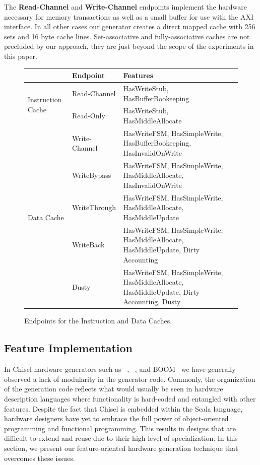 \documentclass[conference]{IEEEtran}
\begin{document}
The \textbf{Read-Channel} and \textbf{Write-Channel} endpoints implement the hardware necessary for memory transactions as well as a small buffer for use with the AXI interface. In all other cases our generator creates a direct mapped cache with 256 sets and 16 byte cache lines. Set-associative and fully-associative caches are not precluded by our approach, they are just beyond the scope of the experiments in this paper.

\begin{figure}[ht]
    \centering
\scriptsize
\begin{tabular}{llll}\toprule
&Endpoint &Features \\\midrule
\multirow{2}{*}{Instruction Cache} &Read-Channel &HasWriteStub, HasBufferBookeeping \\
&Read-Only &HasWriteStub, HasMiddleAllocate \\\midrule
\multirow{5}{*}{Data Cache} &Write-Channel &HasWriteFSM, HasSimpleWrite, HasBufferBookeeping, HasInvalidOnWrite \\
&WriteBypass &HasWriteFSM, HasSimpleWrite, HasMiddleAllocate, HasInvalidOnWrite \\
&WriteThrough &HasWriteFSM, HasSimpleWrite, HasMiddleAllocate, HasMiddleUpdate \\
&WriteBack &HasWriteFSM, HasSimpleWrite, HasMiddleAllocate, HasMiddleUpdate, Dirty Accounting \\
&Dusty &HasWriteFSM, HasSimpleWrite, HasMiddleAllocate, HasMiddleUpdate, Dirty Accounting, Dusty \\
\bottomrule
\end{tabular}
    \caption{Endpoints for the Instruction and Data Caches.}
    \label{fig:Endpoints}
\end{figure}

\subsection{Feature Implementation}\label{sec:implementation}
In Chisel hardware generators such as \Riscvmini{}~\cite{RvMini}, \Rocketchip{}~\cite{chisel:riscv}, and BOOM~\cite{boom} we have generally observed a lack of modularity in the generator code. Commonly, the organization of the generation code reflects what would usually be seen in hardware description languages where functionality is hard-coded and entangled with other features. Despite the fact that Chisel is embedded within the Scala language, hardware designers have yet to embrace the full power of object-oriented programming and functional programming. This results in designs that are difficult to extend and reuse due to their high level of specialization. In this section, we present our feature-oriented hardware generation technique that overcomes these issues.
\end{document}
